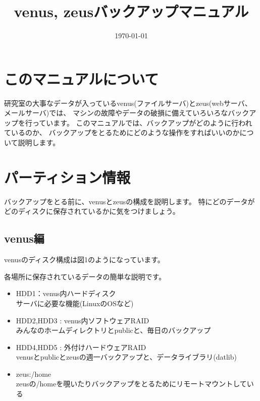 \documentclass[11pt]{jarticle}
\begin{document}
\title{venus, zeusバックアップマニュアル}
\author{}
\date{\today}
\topmargin -20mm        \textheight 250mm       \textwidth 180mm
\oddsidemargin -10mm    \evensidemargin -10mm
\maketitle

\begin{quote}
\begin{screen}
\tableofcontents
\end{screen}
\end{quote}



\section{このマニュアルについて}

研究室の大事なデータが入っているvenus(ファイルサーバ)とzeus(webサーバ、メールサーバ)では、
マシンの故障やデータの破損に備えていろいろなバックアップを行っています。
このマニュアルでは、バックアップがどのように行われているのか、
バックアップをとるためにどのような操作をすればいいのかについて説明します。





\section{パーティション情報 \label{sec:prttn}}

バックアップをとる前に、venusとzeusの構成を説明します。
特にどのデータがどのディスクに保存されているかに気をつけましょう。


\subsection{venus編}


venusのディスク構成は図1のようになっています。

各場所に保存されているデータの簡単な説明です。
\begin{itemize}
\item HDD1：venus内ハードディスク \\
      サーバに必要な機能(LinuxのOSなど)
\item HDD2,HDD3 : venus内ソフトウェアRAID \\
      みんなのホームディレクトリとpublicと、毎日のバックアップ
\item HDD4,HDD5 : 外付けハードウェアRAID \\
      venusとpublicとzeusの週一バックアップと、データライブラリ(datlib)
\item zeus:/home \\
      zeusの/homeを覗いたりバックアップをとるためにリモートマウントしている
\end{itemize}
\end{document}
